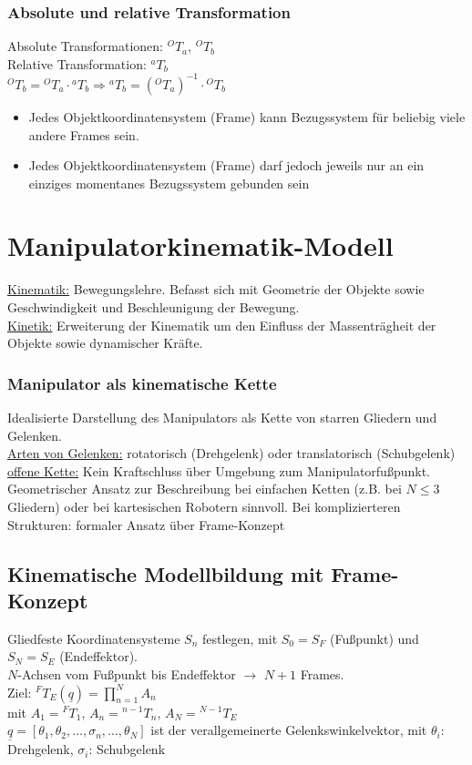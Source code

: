 \documentclass[a4paper,landscape,6pt]{article}
\newcommand{\ul}[1]{\underline{#1}}
\begin{document}
\begin{multicols}{3}
\subsubsection*{Absolute und relative Transformation}
Absolute Transformationen: ${}^{O}{T}_a$, ${}^{O}{T}_b$\\
Relative Transformation: ${}^{a}{T}_b$\\

${}^{O}{T}_b = {}^{O}{T}_a \cdot {}^{a}{T}_b \Rightarrow {}^{a}{T}_b = ({}^{O}{T}_a)^{-1} \cdot {}^{O}{T}_b$
\begin{itemize}
	\item Jedes Objektkoordinatensystem (Frame) kann Bezugssystem für beliebig viele andere Frames sein.
	\item Jedes Objektkoordinatensystem (Frame) darf jedoch jeweils nur an ein einziges momentanes Bezugssystem gebunden sein
\end{itemize}

\section{Manipulatorkinematik-Modell}
\ul{Kinematik:} Bewegungslehre. Befasst sich mit Geometrie der Objekte sowie Geschwindigkeit und Beschleunigung der Bewegung.\\
\ul{Kinetik:} Erweiterung der Kinematik um den Einfluss der Massenträgheit der Objekte sowie dynamischer Kräfte.
\subsubsection*{Manipulator als kinematische Kette}
Idealisierte Darstellung des Manipulators als Kette von starren Gliedern und Gelenken.\\
\ul{Arten von Gelenken:} rotatorisch (Drehgelenk) oder translatorisch (Schubgelenk)\\
\ul{offene Kette:} Kein Kraftschluss über Umgebung zum Manipulatorfußpunkt.\\
Geometrischer Ansatz zur Beschreibung bei einfachen Ketten (z.B. bei $N\le 3$ Gliedern) oder bei kartesischen Robotern sinnvoll. Bei komplizierteren Strukturen: formaler Ansatz über Frame-Konzept
\subsection*{Kinematische Modellbildung mit Frame-Konzept}
Gliedfeste Koordinatensysteme $S_n$ festlegen, mit $S_0 = S_F$ (Fußpunkt) und $S_N = S_E$ (Endeffektor).\\
$N$-Achsen vom Fußpunkt bis Endeffektor $\rightarrow$ $N+1$ Frames.\\
Ziel: ${}^{F}{T}_E(\ul{q}) = \prod\limits_{n=1}^N A_n$\\
mit $A_1 = {}^{F}{T}_1$, $A_n = {}^{n-1}{T}_n$, $A_N = {}^{N-1}{T}_E$\\
$\ul{q} = [\theta_1, \theta_2, \dots , \sigma_n, \dots, \theta_N]$ ist der verallgemeinerte Gelenkswinkelvektor, mit $\theta_i$: Drehgelenk, $\sigma_i$: Schubgelenk

\end{multicols}
\end{document}
